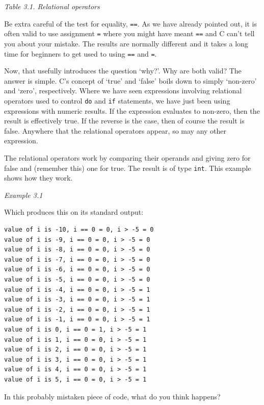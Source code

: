 \begin{center}\textit{Table 3.1. Relational operators}\end{center}


   Be extra careful of the test for equality, \texttt{==}. As we have
    already pointed out, it is often valid to use assignment \texttt{=}
    where you might have meant \texttt{==} and C can't tell you about your
    mistake. The results are normally different and it takes a long time for
    beginners to get used to using \texttt{==} and \texttt{=}.


   Now, that usefully introduces the question `why?'. Why are both
    valid?  The answer is simple. C's concept of `true' and
    `false' boils down to simply `non-zero' and `zero',
    respectively. Where we have seen expressions involving relational
    operators used to control \texttt{do} and \texttt{if}
    statements, we have just been using expressions with numeric results. If
    the expression evaluates to non-zero, then the result is effectively
    true. If the reverse is the case, then of course the result is false.
    Anywhere that the relational operators appear, so may any other
    expression.


   The relational operators work by comparing their operands and giving
    zero for false and (remember this) one for true. The result is of type
    \texttt{int}. This example shows how they work.


   \begin{center}\textit{Example 3.1}\end{center}


   Which produces this on its standard output:


   \begin{Verbatim}
value of i is -10, i == 0 = 0, i > -5 = 0
value of i is -9, i == 0 = 0, i > -5 = 0
value of i is -8, i == 0 = 0, i > -5 = 0
value of i is -7, i == 0 = 0, i > -5 = 0
value of i is -6, i == 0 = 0, i > -5 = 0
value of i is -5, i == 0 = 0, i > -5 = 0
value of i is -4, i == 0 = 0, i > -5 = 1
value of i is -3, i == 0 = 0, i > -5 = 1
value of i is -2, i == 0 = 0, i > -5 = 1
value of i is -1, i == 0 = 0, i > -5 = 1
value of i is 0, i == 0 = 1, i > -5 = 1
value of i is 1, i == 0 = 0, i > -5 = 1
value of i is 2, i == 0 = 0, i > -5 = 1
value of i is 3, i == 0 = 0, i > -5 = 1
value of i is 4, i == 0 = 0, i > -5 = 1
value of i is 5, i == 0 = 0, i > -5 = 1
\end{Verbatim}

   In this probably mistaken piece of code, what do you think happens?


